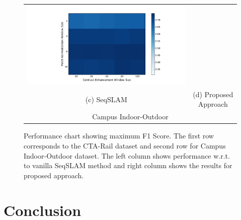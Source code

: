 \documentclass[twocolumn]{article}
\begin{document}
\begin{figure}[!htbp]
\begin{tabular*}{\textwidth}{cc}
 \includegraphics[scale=0.5,trim={5cm 0cm 4cm 0cm},clip]{fig-indoor-outdoor-max-fscore-varyP-varyRw-with} \\
 (c) SeqSLAM & (d) Proposed Approach \\
 \multicolumn{2}{c}{Campus Indoor-Outdoor}
 \end{tabular*}
 \caption{Performance chart showing maximum F1 Score. The first row corresponds to the CTA-Rail dataset and second row for Campus Indoor-Outdoor dataset. The left column shows performance w.r.t. to vanilla SeqSLAM method and right column shows the results for proposed approach.}
 \label{fig:performanceChart}
\end{figure}

\section{Conclusion}



\end{document}
